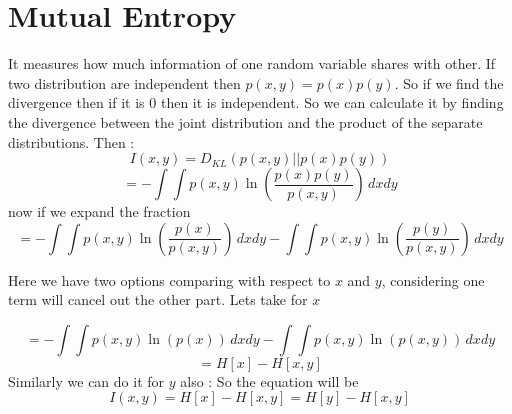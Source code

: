 \documentclass[11pt,a4paper]{article}
\begin{document}
\section{Mutual Entropy}
It measures how much information of one random variable shares with other. If two distribution are independent then $p(x,y) = p(x)p(y)$. So if we find the divergence then if it is 0 then it is independent. So we can calculate it by finding the divergence between the joint distribution and the product of the separate distributions. Then :
\begin{equation}
I(x,y) = D_{KL}\left( p(x,y) || p(x)p(y) \right)
\end{equation}
\begin{equation}
= - \int \int p(x,y) \ln\left( \frac{p(x)p(y)}{p(x,y)} \right) \, dx dy
\end{equation}
now if we expand the fraction 
\begin{equation}
= - \int \int p(x,y) \ln\left( \frac{p(x)}{p(x,y)} \right) \, dx dy  - \int \int p(x,y) \ln\left( \frac{p(y)}{p(x,y)} \right) \, dx dy
\end{equation}

Here we have two options comparing with respect to $x$ and $y$, considering one term will cancel out the other part. Lets take for $x$

\begin{equation}
= - \int \int p(x,y) \ln\left(p(x) \right) \, dx dy  - \int \int p(x,y) \ln\left( p(x,y) \right) \, dx dy
\end{equation}
\begin{equation}
= H[x] - H[x,y]
\end{equation}
Similarly we can do it for $y$ also :
So the equation will be 
\begin{equation}
I(x,y) = H[x] - H[x,y] = H[y] - H[x,y]
\end{equation}
\end{document}
